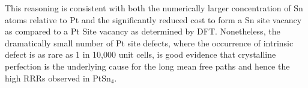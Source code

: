 \par This reasoning is consistent with both the numerically larger concentration of Sn atoms relative to Pt and the significantly reduced cost to form a Sn site vacancy as compared to a Pt Site vacancy as determined by DFT. Nonetheless, the dramatically small number of Pt site defects, where the occurrence of intrinsic defect is as rare as 1 in 10,000 unit cells, is good evidence that crystalline perfection is the underlying cause for the long mean free paths and hence the high RRRs observed in PtSn$_4$. 
